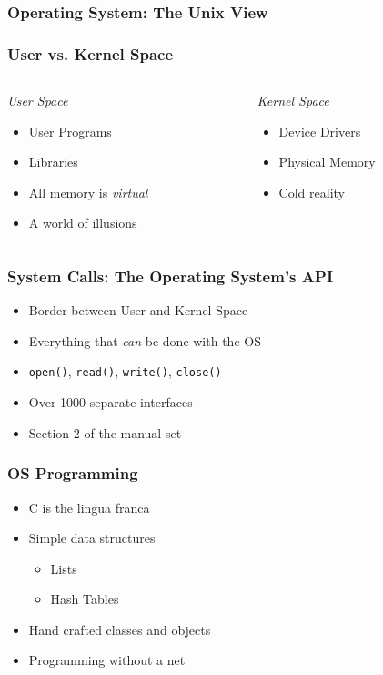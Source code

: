 \documentclass[pdftex]{beamer} %
\begin{document}
\begin{frame}
  \frametitle{Operating System: The Unix View}
  
\end{frame}

\begin{frame}[fragile]
  \frametitle{User vs. Kernel Space}
  \begin{columns}[t]
    \begin{column}{5cm}
      \emph{User Space}
      \begin{itemize}
      \item User Programs
      \item Libraries
      \item All memory is \emph{virtual}
      \item A world of illusions
      \end{itemize}
    \end{column}
    \begin{column}{5cm}
      \emph{Kernel Space}
      \begin{itemize}
      \item Device Drivers
      \item Physical Memory
      \item Cold reality
      \end{itemize}
    \end{column}
  \end{columns}
\end{frame}

\begin{frame}[fragile]
  \frametitle{System Calls: The Operating System's API}
  \begin{itemize}
  \item Border between User and Kernel Space
  \item Everything that \emph{can} be done with the OS
  \item \verb|open()|, \verb|read()|, \verb|write()|, \verb|close()|
  \item Over 1000 separate interfaces
  \item Section 2 of the manual set
  \end{itemize}
\end{frame}

\begin{frame}
  \frametitle{OS Programming}
  \begin{itemize}
  \item C is the lingua franca
  \item Simple data structures
    \begin{itemize}
    \item Lists
    \item Hash Tables
    \end{itemize}
  \item Hand crafted classes and objects
  \item Programming without a net
  \end{itemize}
\end{frame}
\end{document}
